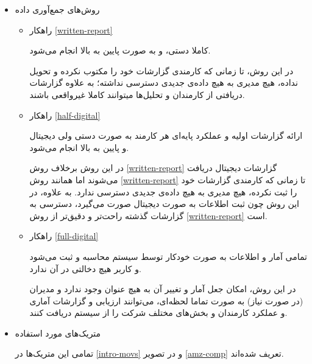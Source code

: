 \documentclass[12pt, dvipsnames, svgnames, x11names,]{article}
\begin{document}
\begin{itemize}
\item         
روش‌های جمع‌آوری داده
\begin{itemize}
    \item راهکار \ref{written-report} 
    
    کاملا دستی، و به صورت پایین به بالا انجام می‌شود.
  
  در این روش، تا زمانی که کارمندی گزارشات خود را مکتوب نکرده و تحویل نداده، هیچ مدیری به هیچ داده‌ی جدیدی دسترسی نداشته؛ به علاوه گزارشات دریافتی از کارمندان و تحلیل‌ها میتوانند کاملا غیرواقعی‌ باشند.
    \item راهکار \ref{half-digital}
    
    ارائه گزارشات اولیه و عملکرد پایه‌ای هر کارمند به صورت دستی ولی دیجیتال و پایین به بالا انجام می‌شود.
    
    در این روش برخلاف روش \ref{written-report} گزارشات دیجیتال دریافت می‌شوند اما همانند روش \ref{written-report} تا زمانی که کارمندی گزارشات خود را ثبت نکرده، هیچ مدیری به هیچ داده‌ی جدیدی دسترسی ندارد. به علاوه، در این روش چون ثبت اطلاعات به صورت دیجیتال صورت می‌گیرد، دسترسی به گزارشات گذشته راحت‌تر و دقیق‌تر از روش \ref{written-report} است.
    
    \item راهکار \ref{full-digital}
    
    تمامی آمار و اطلاعات به صورت خودکار توسط سیستم محاسبه و ثبت می‌شود و کاربر هیچ دخالتی در آن ندارد.
    
    در این روش، امکان جعل آمار و تغییر آن به هیچ عنوان وجود ندارد و مدیران (در صورت نیاز) به صورت تماما لحظه‌ای، می‌توانند ارزیابی و گزارشات آماری و عملکرد کارمندان و بخش‌های مختلف شرکت را از سیستم دریافت کنند.
\end{itemize}
\item         
متریک‌های مورد استفاده

تمامی این متریک‌ها در \ref{intro-movs} و در تصویر \ref{amz-comp} تعریف شده‌اند.


\end{itemize}
\end{document}
